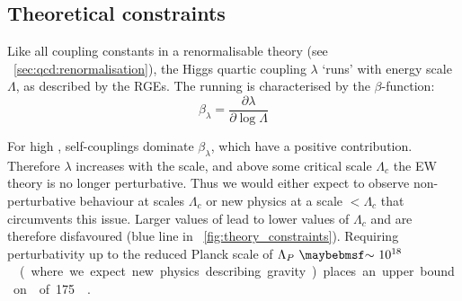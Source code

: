


\subsection{Theoretical constraints}
\label{sec:prior_constraints:theory}

Like all coupling constants in a renormalisable theory (see 
\Section~\ref{sec:qcd:renormalisation}), the Higgs quartic coupling $\lambda$ `runs' with 
energy scale $\Lambda$, as described by the \acp{RGE}. The running is characterised by 
the $\beta$-function:
\begin{equation*}
	\beta_{\lambda} = \frac{\partial \lambda}{\partial \log\Lambda}
\end{equation*}

For high \mH, self-couplings dominate $\beta_{\lambda}$, which have a
positive contribution. Therefore $\lambda$ increases with the scale, and above some 
critical scale $\Lambda_c$ the \ac{EW} theory is no longer perturbative. Thus we would 
either expect to observe non-perturbative behaviour at scales \about$\Lambda_c$ or new 
physics at a scale $<\Lambda_c$ that circumvents this issue. Larger values of \mH lead to 
lower values of $\Lambda_c$ and are therefore disfavoured (blue line in 
\Figure~\ref{fig:theory_constraints}). Requiring perturbativity up to the 
reduced Planck scale of \unit{$\Lambda_{P}~\about~10^{18}$}{\GeV} (where we expect new 
physics describing gravity) places an upper bound on \mH of \unit{175}{\GeV} 
\cite{Ellis:2009}.

